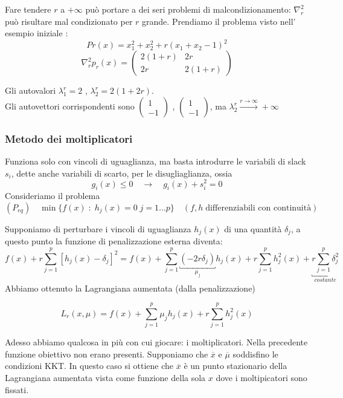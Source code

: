 \begin{observation}
Fare tendere $r$ a $ + \infty$ pu\`o portare a dei seri
problemi di malcondizionamento:
$\nabla_r^{2}$ pu\`o risultare mal condizionato per $r$ grande.
Prendiamo il problema visto nell' esempio iniziale :
$$ Pr(x) = x_1^{2} + x_2^{2} + r(x_1 + x_2 -1)^{2} $$
$$ \nabla_{r}^{2} p_r(x) =
\begin{pmatrix}
2(1+r) & 2r \\
2r &  2(1+r)
\end{pmatrix}
$$

Gli autovalori $\lambda_1^{r} = 2$
, $\lambda_2^{r} = 2(1+2r)$. \\
Gli autovettori corrispondenti sono
$\begin{pmatrix}
1 \\
-1
\end{pmatrix}
$
,
$\begin{pmatrix}
 1 \\
-1
\end{pmatrix}
$,
ma $\lambda_2^{r} \xrightarrow{ r \to \infty} +\infty$
\end{observation}

\subsubsection{Metodo dei moltiplicatori}
Funziona solo con vincoli di uguaglianza, ma basta
introdurre le variabili di slack $s_i$, dette anche
variabili di scarto,  per le disugliaglianza, ossia
$$ g_i(x) \leq 0 \quad \longrightarrow  \quad g_i(x) + s_i^{2} = 0$$
Consideriamo il problema
$$ (P_{eq}) \quad \min\{ f(x) \; : \; h_j(x) = 0 \; j=1\ldots p \} \quad
(f,h \; \text{differenziabili con continuit\`a}) $$

Supponiamo di perturbare i vincoli di uguaglianza $h_j(x)$ di una
quantit\`a $\delta_j$, a questo punto la funzione di penalizzazione
esterna diventa:
$$f(x) + r
\displaystyle \sum_{j=1}^{p}
\left[h_j(x) - \delta_j\right]^{2} =
f(x) + \displaystyle
\sum_{j=1}^{p}
\underbracket{(-2r\delta_j)}_{\mu_j}h_j(x) +
r \displaystyle
\sum_{j=1}^{p}
h_j^{2}(x) +
\underbracket{r \displaystyle \sum_{j=1}^{p} \delta_j^{2}}_{costante}
$$
Abbiamo ottenuto la Lagrangiana aumentata (dalla penalizzazione)
\begin{defn}
$$L_r(x, \mu) = f(x)+ \displaystyle  \sum_{j=1}^{p}
\mu_j h_j(x) + r \displaystyle \sum_{j=1}^{p}
h_j^{2}(x)
$$  
\end{defn}
Adesso abbiamo qualcosa in pi\`u con cui giocare: i moltiplicatori.
Nella precedente funzione obiettivo non erano presenti.
Supponiamo che $\overline{x}$ e $\overline{\mu}$ soddisfino
le condizioni KKT. In questo caso si ottiene che $\overline{x}$ \`e
un punto stazionario della Lagrangiana aumentata vista come funzione
della sola $x$ dove i moltipicatori sono fissati.

